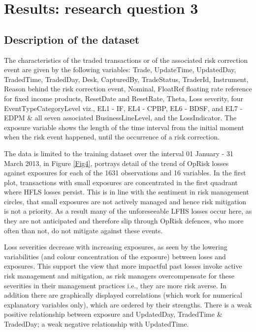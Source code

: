 \documentclass[a4paper]{article}
\begin{document}
\section{Results: research question 3}

\subsection{Description of the dataset}

The characteristics of the traded transactions or of the associated risk correction event are given by the following variables: Trade, UpdateTime, UpdatedDay, TradedTime, TradedDay, Desk, CapturedBy, TradeStatus, TraderId, Instrument, Reason behind the risk correction event, Nominal, FloatRef floating rate reference for fixed income products, ResetDate and ResetRate, Theta, Loss severity, four EventTypeCategoryLevel viz., EL1 - IF, EL4 - CPBP, EL6 - BDSF, and EL7 - EDPM  \& all seven associated  BusinessLineLevel, and the LossIndicator. The exposure variable shows the length of the time interval from the initial moment when the risk event happened, until the occurrence of a risk correction.\medskip

The data is limited to the training dataset over the interval 01 January - 31 March 2013, in Figure \ref{Fig4}, portrays detail of the trend of OpRisk losses against exposures for each of the 1631 observations and 16 variables. In the first plot, transactions with small exposures are concentrated in the first quadrant where HFLS losses persist. This is in line with the sentiment in risk management circles, that small exposures are not actively managed and hence risk mitigation is not a priority. As a result many of the unforeseeable LFHS losses occur here, as they are not anticipated and therefore slip through OpRisk defences, who more often than not, do not mitigate against these events.\medskip

Loss severities decrease with increasing exposures, as seen by the lowering variabilities (and colour concentration of the exposure) between loses and exposures. This  support the view that more impactful past losses invoke active risk management and mitigation, as risk managers overcompensate for these severities in their management practices i.e., they are more risk averse. In addition there are graphically displayed correlations (which work for numerical explanatory variables only), which are ordered by their strengths. There is a weak positive relationship between exposure and UpdatedDay, TradedTime \& TradedDay; a weak negative relationship with UpdatedTime.  
\end{document}
